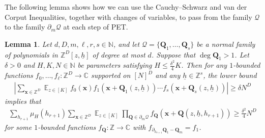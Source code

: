 \documentclass[11pt]{amsart}
\newtheorem{lemma}{Lemma}[section]
\theoremstyle{definition}
\DeclareMathOperator*{\E}{\mathbb{E}}
\newcommand{\C}{{\mathbb C}}
\newcommand{\N}{{\mathbb N}}
\newcommand{\Z}{{\mathbb Z}}
\newcommand{\CP}{{\mathcal P}}
\newcommand{\CQ}{{\mathcal Q}}
\newcommand{\bq}{{\textbf{Q}}}
\newcommand{\q}{{\textbf{Q}}}
\newcommand{\bx}{{\textbf{x}}}
\newcommand{\uh}{{\underline{h}}}
\newcommand{\abs}[1]{\mathopen{}\left| #1\mathclose{}\right|}
\begin{document}
 
    The following lemma shows how we can use the Cauchy--Schwarz and van der Corput Inequalities, together with changes of variables, to pass  from the family $\CQ$ to the family $\partial_m\CQ$ at each step of PET.
    \begin{lemma}\label{L: bounding averages in vdC}
        Let $d, D, m, \ell, r, s\in\N$, and let $\CQ = \{\q_1, \ldots, \q_s\}$ be a normal family of polynomials in $\Z^D[z,\uh]$ of degree at most $d$. Suppose that $\deg \q_1 >1$.
        Let $\delta>0$ and $H, K, N\in\N$ be parameters satisfying 
        $H\leq \frac{\delta^2}{4}K$. Then for any $1$-bounded functions $f_0, \ldots, f_\ell:\Z^D\to\C$ supported on $[N]^D$ and any $\uh\in\Z^s$, the lower bound
        \begin{align*}
            \abs{\sum_{\bx\in\Z^D}\E_{z\in[K]}
            f_0(\bx)f_1(\bx+\q_1(z,\uh))\cdots f_{s}(\bx+\q_s(z,\uh))} \geq \delta N^D
        \end{align*}
        implies that
        \begin{align*}
            \sum_{h_{r+1}}\mu_H(h_{r+1})\sum_{\bx\in\Z^D}\E_{z\in[K]}\prod_{\bq\in\partial_m\CQ}f_{\bq}(\bx+\q(z,\uh, h_{r+1}))\geq \frac{\delta^2}{4}N^D
        \end{align*}
        for some $1$-bounded functions $f_\bq:\Z\to\C$ with $f_{\partial_{h_{r+1}}\q_1 - \q_m} = f_1$. 
    \end{lemma}
\end{document}
